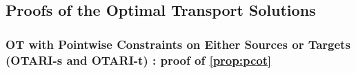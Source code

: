     
    


\subsection{Proofs of the Optimal Transport Solutions}

\subsubsection{OT with Pointwise Constraints on Either Sources or Targets (OTARI-s and OTARI-t) : proof of \cref{prop:pcot}}\label{sec:proofs}

